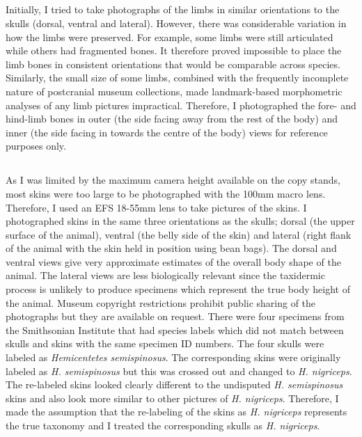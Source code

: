 	\subsection{}
	Initially, I tried to take photographs of the limbs in similar orientations to the skulls (dorsal, ventral and lateral). However, there was considerable variation in how the limbs were preserved. For example, some limbs were still articulated while others had fragmented bones. It therefore proved impossible to place the limb bones in consistent orientations that would be comparable across species. Similarly, the small size of some limbs, combined with the frequently incomplete nature of postcranial museum collections, made landmark-based morphometric analyses of any limb pictures impractical. Therefore, I photographed the fore- and hind-limb bones in outer (the side facing away from the rest of the body) and inner (the side facing in towards the centre of the body) views for reference purposes only.	
	
	\subsection{}
	As I was limited by the maximum camera height available on the copy stands, most skins were too large to be photographed with the 100mm macro lens. Therefore, I used an EFS 18-55mm lens to take pictures of the skins. I photographed skins in the same three orientations as the skulls; dorsal (the upper surface of the animal), ventral (the belly side of the skin) and lateral (right flank of the animal with the skin held in position using bean bags). The dorsal and ventral views give very approximate estimates of the overall body shape of the animal. The lateral views are less biologically relevant since the taxidermic process is unlikely to produce specimens which represent the true body height of the animal. Museum copyright restrictions prohibit public sharing of the photographs but they are available on request.
	There were four specimens from the Smithsonian Institute that had species labels which did not match between skulls and skins with the same specimen ID numbers. The four skulls were labeled as \textit{Hemicentetes semispinosus}. The corresponding skins were originally labeled as \textit{H. semispinosus} but this was crossed out and changed to \textit{H. nigriceps}. The re-labeled skins looked clearly different to the undisputed \textit{H. semispinosus} skins and also look more similar to other pictures of \textit{H. nigriceps}. Therefore, I made the assumption that the re-labeling of the skins as \textit{H. nigriceps} represents the true taxonomy and I treated the corresponding skulls as \textit{H. nigriceps}.


	

	
